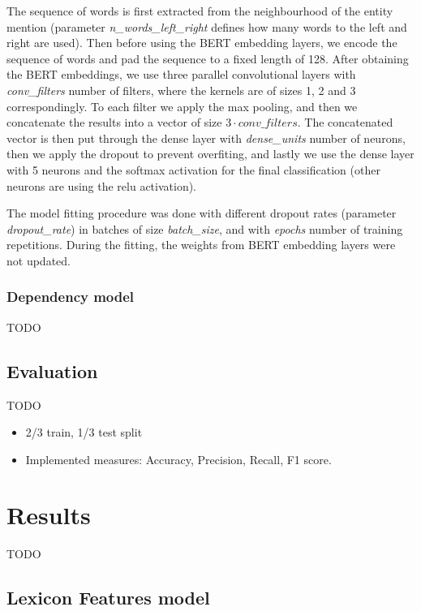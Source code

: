 \documentclass[11pt,a4paper]{article}
\begin{document}
The sequence of words is first extracted from the neighbourhood of the entity mention (parameter \textit{n\_words\_left\_right} defines how many words to the left and right are used).
Then before using the BERT embedding layers, we encode the sequence of words and pad the sequence to a fixed length of 128.
After obtaining the BERT embeddings, we use three parallel convolutional layers with \textit{conv\_filters} number of filters, where the kernels are of sizes 1, 2 and 3 correspondingly.
To each filter we apply the max pooling, and then we concatenate the results into a vector of size $3 \cdot \textit{conv\_filters}$.
The concatenated vector is then put through the dense layer with \textit{dense\_units} number of neurons, then we apply the dropout to prevent overfiting, and lastly we use the dense layer with 5 neurons and the softmax activation for the final classification (other neurons are using the relu activation).

The model fitting procedure was done with different dropout rates (parameter \textit{dropout\_rate}) in batches of size \textit{batch\_size}, and with \textit{epochs} number of training repetitions.
During the fitting, the weights from BERT embedding layers were not updated.

\subsubsection{Dependency model}

TODO

\subsection{Evaluation}

TODO
\begin{itemize}
    \item 2/3 train, 1/3 test split
    \item Implemented measures: Accuracy, Precision, Recall, F1 score.
\end{itemize}



\section{Results}

TODO

\subsection{Lexicon Features model}
\end{document}
